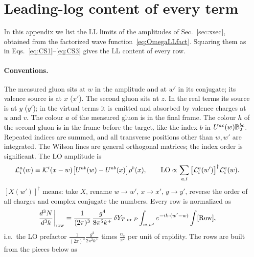 \section{Leading-log content of every term}\label{app:LLrows}

In this appendix we list the LL limits of the amplitudes of Sec.~\ref{sec:xsec}, obtained from the factorized wave function~\eqref{eq:OmegaLLfact}. Squaring them as in Eqs.~\eqref{eq:CS1}--\eqref{eq:CS3} gives the LL content of every row.

\paragraph*{Conventions.} The measured gluon sits at $w$ in the amplitude and at $w'$ in its conjugate; its valence source is at $x$ ($x'$). The second gluon sits at $z$. In the real terms its source is at $y$ ($y'$); in the virtual terms it is emitted and absorbed by valence charges at $u$ and $v$. The colour $a$ of the measured gluon is in the final frame. The colour $h$ of the second gluon is in the frame before the target, like the index $b$ in $U^{ac}(w)\mathbb{B}_2^{bc}$. Repeated indices are summed, and all transverse positions other than $w,w'$ are integrated. The Wilson lines are general orthogonal matrices; the index order is significant. The LO amplitude is
\begin{equation}
\mathcal L^a_i(w)\equiv\mathcal{K}^i(x-w)\big[U^{ab}(w)-U^{ab}(x)\big]\rho^b(x),\qquad {\rm LO}\propto\sum_{a,i}\big[\mathcal L^a_i(w')\big]^\dagger\mathcal L^a_i(w).
\end{equation}
$[X(w')]^\dagger$ means: take $X$, rename $w\to w'$, $x\to x'$, $y\to y'$, reverse the order of all charges and complex conjugate the numbers. Every row is normalized as
\begin{equation}
\frac{d^3N}{d^3k}\bigg|_{\rm row}=\frac{1}{(2\pi)^3}\,\frac{g^4}{8\pi^5k^+}\,\delta Y_{T\text{ or }P}\int_{w,w'}e^{-ik\cdot(w'-w)}\int[\text{Row}],
\label{eq:LLnorm}
\end{equation}
i.e.\ the LO prefactor $\frac{1}{(2\pi)^3}\frac{g^2}{2\pi^2k^+}$ times $\frac{\alpha_s}{\pi^2}$ per unit of rapidity. The rows are built from the pieces below as
